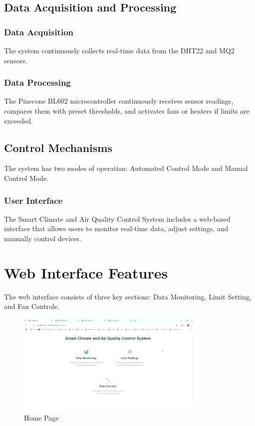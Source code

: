 \documentclass[a4paper]{scrartcl}
\begin{document}
\subsection{Data Acquisition and Processing}
\subsubsection{Data Acquisition}
The system continuously collects real-time data from the DHT22 and MQ2 sensors.

\subsubsection{Data Processing}
The Pinecone BL602 microcontroller continuously receives sensor readings, compares them with preset thresholds, and activates fans or heaters if limits are exceeded.

\subsection{Control Mechanisms}
The system has two modes of operation: Automated Control Mode and Manual Control Mode. 

\subsubsection{User Interface}
The Smart Climate and Air Quality Control System includes a web-based interface that allows users to monitor real-time data, adjust settings, and manually control devices.

\section{Web Interface Features}
The web interface consists of three key sections: Data Monitoring, Limit Setting, and Fan Controls.

\begin{figure}[H]
    \centering
    \includegraphics[width=0.8\textwidth]{images/HP.jpg}
    \caption{Home Page}
\end{figure}
\end{document}
